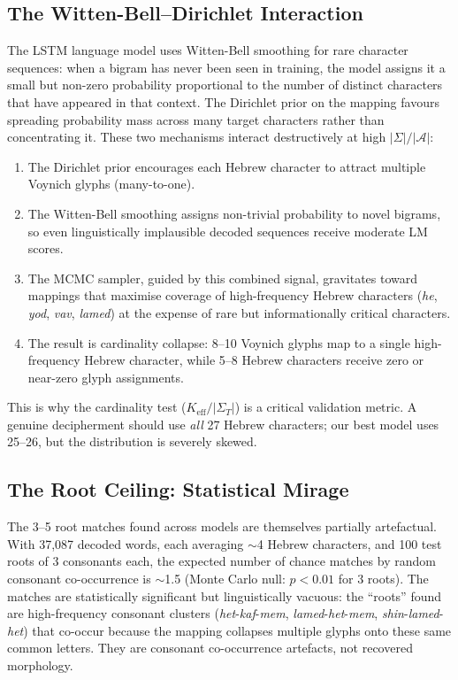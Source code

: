 \documentclass[11pt,a4paper]{article}
\begin{document}
\subsection{The Witten-Bell--Dirichlet Interaction}

The LSTM language model uses Witten-Bell smoothing for rare character sequences: when a bigram has never been seen in training, the model assigns it a small but non-zero probability proportional to the number of distinct characters that have appeared in that context.  The Dirichlet prior on the mapping favours spreading probability mass across many target characters rather than concentrating it.  These two mechanisms interact destructively at high $|\Sigma|/|\mathcal{A}|$:

\begin{enumerate}[nosep]
  \item The Dirichlet prior encourages each Hebrew character to attract multiple Voynich glyphs (many-to-one).
  \item The Witten-Bell smoothing assigns non-trivial probability to novel bigrams, so even linguistically implausible decoded sequences receive moderate LM scores.
  \item The MCMC sampler, guided by this combined signal, gravitates toward mappings that maximise coverage of high-frequency Hebrew characters (\emph{he}, \emph{yod}, \emph{vav}, \emph{lamed}) at the expense of rare but informationally critical characters.
  \item The result is cardinality collapse: 8--10 Voynich glyphs map to a single high-frequency Hebrew character, while 5--8 Hebrew characters receive zero or near-zero glyph assignments.
\end{enumerate}

This is why the cardinality test ($K_{\text{eff}}/|\Sigma_T|$) is a critical validation metric.  A genuine decipherment should use \emph{all} 27 Hebrew characters; our best model uses 25--26, but the distribution is severely skewed.

\subsection{The Root Ceiling: Statistical Mirage}

The 3--5 root matches found across models are themselves partially artefactual.  With 37,087 decoded words, each averaging $\sim$4 Hebrew characters, and 100 test roots of 3 consonants each, the expected number of chance matches by random consonant co-occurrence is $\sim$1.5 (Monte Carlo null: $p < 0.01$ for 3 roots).  The matches are statistically significant but linguistically vacuous: the ``roots'' found are high-frequency consonant clusters (\emph{het}-\emph{kaf}-\emph{mem}, \emph{lamed}-\emph{het}-\emph{mem}, \emph{shin}-\emph{lamed}-\emph{het}) that co-occur because the mapping collapses multiple glyphs onto these same common letters.  They are consonant co-occurrence artefacts, not recovered morphology.
\end{document}
